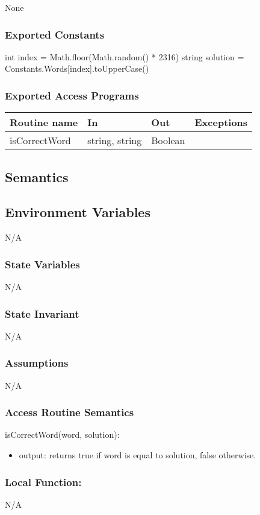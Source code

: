 \documentclass[12pt]{article}
\begin{document}
None

\subsubsection* {Exported Constants}

int index = Math.floor(Math.random() * 2316)
\newline
string solution = Constants.Words[index].toUpperCase()

\subsubsection* {Exported Access Programs}

\begin{tabular}{| l | l | l | p{6cm} |}
\hline
\textbf{Routine name} & \textbf{In} & \textbf{Out} & \textbf{Exceptions}\\
\hline
isCorrectWord & string, string & Boolean &  \\
\hline
\end{tabular}

\subsection* {Semantics}

\subsection*{Environment Variables}
N/A


\subsubsection* {State Variables}
N/A
\subsubsection* {State Invariant}
N/A
\subsubsection* {Assumptions}
N/A

\subsubsection* {Access Routine Semantics}

\noindent isCorrectWord(word, solution):
\begin{itemize}
  \item output: returns true if word is equal to solution, false otherwise.
\end{itemize}

\subsubsection*{Local Function:}

N/A
\end{document}
